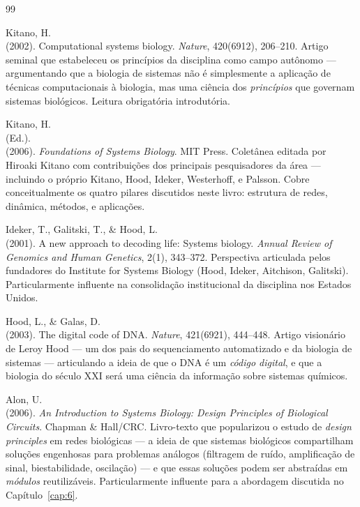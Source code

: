 \begin{thebibliography}{99}

 Kitano, H.\\ (2002). Computational systems biology. \emph{Nature}, 420(6912), 206--210. Artigo seminal que estabeleceu os princípios da disciplina como campo autônomo --- argumentando que a biologia de sistemas não é simplesmente a aplicação de técnicas computacionais à biologia, mas uma ciência dos \emph{princípios} que governam sistemas biológicos. Leitura obrigatória introdutória.

 Kitano, H.\\ (Ed.).\\ (2006). \emph{Foundations of Systems Biology}. MIT Press. Coletânea editada por Hiroaki Kitano com contribuições dos principais pesquisadores da área --- incluindo o próprio Kitano, Hood, Ideker, Westerhoff, e Palsson. Cobre conceitualmente os quatro pilares discutidos neste livro: estrutura de redes, dinâmica, métodos, e aplicações.

 Ideker, T., Galitski, T., \& Hood, L.\\ (2001). A new approach to decoding life: Systems biology. \emph{Annual Review of Genomics and Human Genetics}, 2(1), 343--372. Perspectiva articulada pelos fundadores do Institute for Systems Biology (Hood, Ideker, Aitchison, Galitski). Particularmente influente na consolidação institucional da disciplina nos Estados Unidos.

 Hood, L., \& Galas, D.\\ (2003). The digital code of DNA. \emph{Nature}, 421(6921), 444--448. Artigo visionário de Leroy Hood --- um dos pais do sequenciamento automatizado e da biologia de sistemas --- articulando a ideia de que o DNA é um \emph{código digital}, e que a biologia do século XXI será uma ciência da informação sobre sistemas químicos.

 Alon, U.\\ (2006). \emph{An Introduction to Systems Biology: Design Principles of Biological Circuits}. Chapman \& Hall/CRC. Livro-texto que popularizou o estudo de \emph{design principles} em redes biológicas --- a ideia de que sistemas biológicos compartilham soluções engenhosas para problemas análogos (filtragem de ruído, amplificação de sinal, biestabilidade, oscilação) --- e que essas soluções podem ser abstraídas em \emph{módulos} reutilizáveis. Particularmente influente para a abordagem discutida no Capítulo~\ref{cap:6}.


\end{thebibliography}
